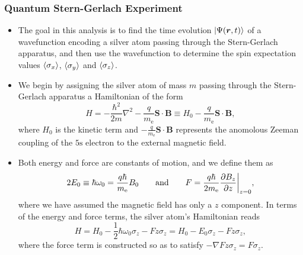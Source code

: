 \documentclass[11pt, a4paper]{article}
\renewcommand{\grad}{\nabla}
\renewcommand{\laplacian}{\nabla^{2}}
\newcommand{\Ham}{Hamiltonian\xspace}
\newcommand{\SG}{Stern-Gerlach\xspace}
\renewcommand{\vec}[1]{\bm{#1}}  %
\renewcommand{\r}{\vec{r}}  %
\renewcommand{\S}{\vec{S}}  %
\newcommand{\B}{\vec{B}}  %
\begin{document}
\subsubsection{Quantum Stern-Gerlach Experiment} \label{sss:sg-quantum}
\begin{itemize}
    \item The goal in this analysis is to find the time evolution $ \ket{\Psi(\r, t)} $ of a wavefunction encoding a silver atom passing through the \SG apparatus, and then use the wavefunction to determine the spin expectation values $ \ev{\sigma_{x}} $, $ \ev{\sigma_{y}} $ and $ \ev{\sigma_{z}} $.

    \item We begin by assigning the silver atom of mass $ m $ passing through the \SG apparatus a \Ham of the form
    \begin{equation*}
        H = - \frac{\hbar^{2}}{2m}\laplacian - \frac{q}{m_{\text{e}}}\S \cdot \B \equiv H_{0} - \frac{q}{m_{\text{e}}} \S \cdot \B,
    \end{equation*}
    where $ H_{0} $ is the kinetic term and $ - \frac{q}{m_{\text{e}}} \S \cdot \B $ represents the anomolous Zeeman coupling of the $ 5 \mathrm{s} $ electron to the external magnetic field.

    \item Both energy and force are constants of motion, and we define them as
    \begin{equation*}
        2 E_{0} \equiv \hbar \omega_{0} = \frac{q \hbar}{m_{\text{e}}} B_{0} \qquad \text{and} \qquad F = \frac{q \hbar}{2m_{\text{e}}} \pdv{B_{z}}{z} \bigg |_{z = 0},
    \end{equation*}
    where we have assumed the magnetic field has only a $ z $ component. In terms of the energy and force terms, the silver atom's \Ham reads
    \begin{equation*}
        H = H_{0} - \frac{1}{2}\hbar \omega_{0} \sigma_{z} - F z \sigma_{z} = H_{0} - E_{0} \sigma_{z} - F z \sigma_{z},
    \end{equation*}
    where the force term is constructed so as to satisfy $ - \grad F z \sigma_{z} = F\sigma_{z} $.
    

\end{itemize}
\end{document}
